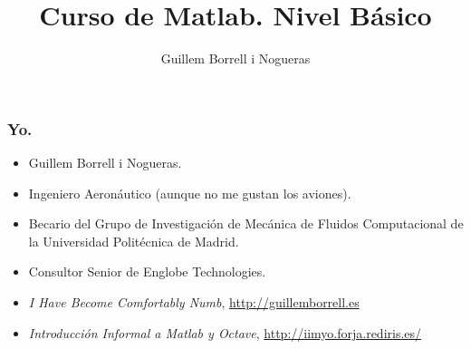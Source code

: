 \documentclass[12pt]{beamer}
\title{Curso de Matlab.  Nivel Básico}
\author{Guillem Borrell i Nogueras}
\begin{document}

\begin{frame}
  \titlepage
\end{frame}

\begin{frame}
  \frametitle{Yo.}
  \begin{itemize}
  \item Guillem Borrell i Nogueras.
  \item Ingeniero Aeronáutico (aunque no me gustan los aviones).
  \item Becario del Grupo de Investigación de Mecánica de Fluidos
    Computacional de la Universidad Politécnica de Madrid.
  \item Consultor Senior de Englobe Technologies.
  \item \textit{I Have Become Comfortably Numb},
    \url{http://guillemborrell.es}
  \item \textit{Introducción Informal a Matlab y Octave},
    \url{http://iimyo.forja.rediris.es/}
  \end{itemize}
\end{frame}
\end{document}
